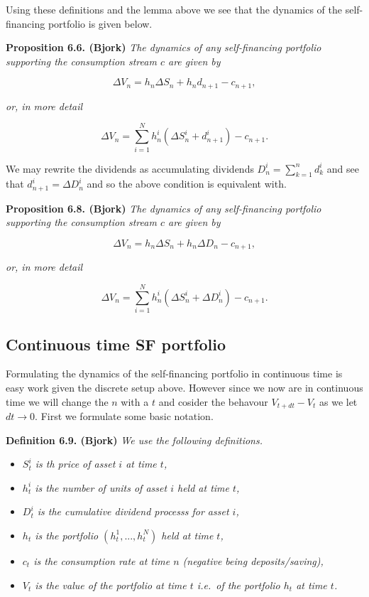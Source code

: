 \documentclass[
]{book}
\providecommand{\tightlist}{%
  \setlength{\itemsep}{0pt}\setlength{\parskip}{0pt}}
\begin{document}
Using these definitions and the lemma above we see that the dynamics of the self-financing portfolio is given below.

\textbf{Proposition 6.6. (Bjork)} \emph{The dynamics of any self-financing portfolio supporting the consumption stream \(c\) are given by}

\[
\Delta V_n=h_n \Delta S_n+h_nd_{n+1}-c_{n+1},\tag{6.11}
\]

\emph{or, in more detail}

\[
\Delta V_n=\sum_{i=1}^Nh_n^i(\Delta S_n^i+d^i_{n+1})-c_{n+1}.\tag{6.12}
\]

We may rewrite the dividends as accumulating dividends \(D^i_n=\sum_{k=1}^nd^i_k\) and see that \(d_{n+1}^i=\Delta D^i_n\) and so the above condition is equivalent with.

\textbf{Proposition 6.8. (Bjork)} \emph{The dynamics of any self-financing portfolio supporting the consumption stream \(c\) are given by}

\[
\Delta V_n=h_n \Delta S_n+h_n\Delta D_n-c_{n+1},\tag{6.15}
\]

\emph{or, in more detail}

\[
\Delta V_n=\sum_{i=1}^Nh_n^i(\Delta S_n^i+\Delta D^i_n)-c_{n+1}.\tag{6.16}
\]

\hypertarget{continuous-time-sf-portfolio}{%
\subsection{Continuous time SF portfolio}\label{continuous-time-sf-portfolio}}

Formulating the dynamics of the self-financing portfolio in continuous time is easy work given the discrete setup above. However since we now are in continuous time we will change the \(n\) with a \(t\) and cosider the behavour \(V_{t+dt}-V_t\) as we let \(dt\to 0\). First we formulate some basic notation.

\textbf{Definition 6.9. (Bjork)} \emph{We use the following definitions.}

\begin{itemize}
\tightlist
\item
  \emph{\(S_t^i\) is th price of asset \(i\) at time \(t\),}
\item
  \emph{\(h_t^i\) is the number of units of asset \(i\) held at time \(t\),}
\item
  \emph{\(D_t^i\) is the cumulative dividend processs for asset \(i\),}
\item
  \emph{\(h_t\) is the portfolio \((h_t^1,...,h_t^N)\) held at time \(t\),}
\item
  \emph{\(c_t\) is the consumption rate at time \(n\) (negative being deposits/saving),}
\item
  \emph{\(V_t\) is the value of the portfolio at time \(t\) i.e.~of the portfolio \(h_t\) at time \(t\).}
\end{itemize}
\end{document}
